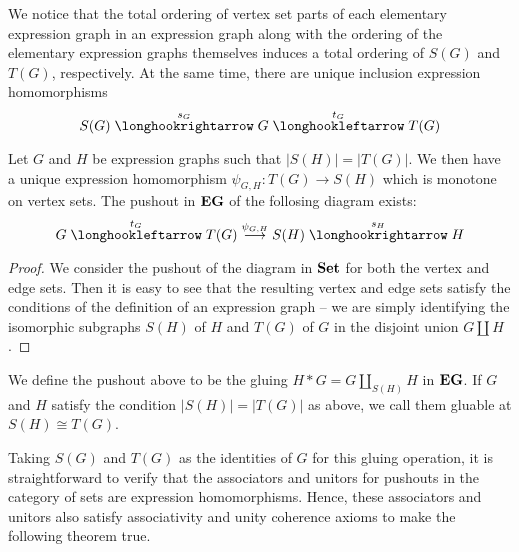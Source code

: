 \documentclass[./Thick_TQFTs_and_Quantum_Information.tex]{subfiles}
\begin{document}
\begin{rmk}
We notice that the total ordering of vertex set parts of each elementary
expression graph in an expression graph along with the ordering of the elementary
expression graphs themselves induces a total ordering of $S(G)$ and $T(G)$,
respectively. At the same time, there are unique inclusion expression
homomorphisms
\[
  S(G) \hto[s_G] G \hot[t_G] T(G)
\]
\end{rmk}

\begin{lem}
Let $G$ and $H$ be expression graphs such that $|S(H)| = |T(G)|$.
We then have a unique expression homomorphism $\psi_{G, H} : T(G) \to S(H)$ which
is monotone on vertex sets. The pushout in $\textbf{EG}$ of the follosing diagram
exists:
\[
  G \hot[t_G] T(G) \to[\psi_{G, H}] S(H) \hto[s_H] H
\]
\end{lem}
\begin{proof}
We consider the pushout of the diagram in $\textbf{Set}$ for both the vertex and edge
sets. Then it is easy to see that the resulting vertex and edge sets satisfy the
conditions of the definition of an expression graph -- we are simply identifying
the isomorphic subgraphs $S(H)$ of $H$ and $T(G)$ of $G$ in the disjoint union
$G \amalg H$.
\end{proof}

\begin{defn}
We define the pushout above to be the gluing $H * G = G \amalg_{S(H)} H$ in
$\textbf{EG}$. If $G$ and $H$ satisfy the condition $|S(H)| = |T(G)|$ as above, we call
them gluable at $S(H) \cong T(G)$.
\end{defn}

Taking $S(G)$ and $T(G)$ as the identities of $G$ for this gluing operation, it
is straightforward to verify that the associators and unitors for pushouts in
the category of sets are expression homomorphisms. Hence, these associators and
unitors also satisfy associativity and unity coherence axioms to make the
following theorem true. 
\end{document}
